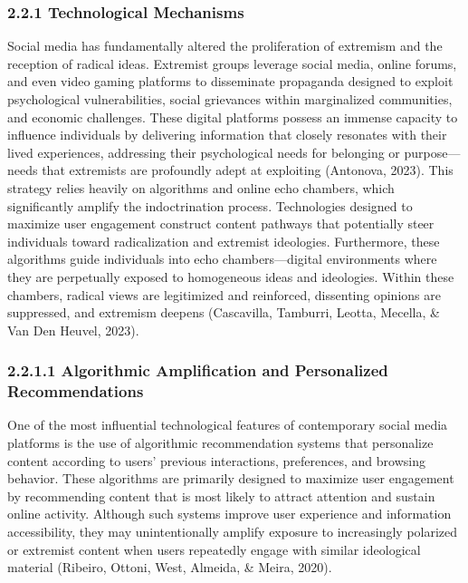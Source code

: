\documentclass[10pt]{NSP1}
\begin{document}
	\subsubsection*{2.2.1 Technological Mechanisms}
	
	Social media has fundamentally altered the proliferation of extremism and the reception of radical ideas. Extremist groups leverage social media, online forums, and even video gaming platforms to disseminate propaganda designed to exploit psychological vulnerabilities, social grievances within marginalized communities, and economic challenges. These digital platforms possess an immense capacity to influence individuals by delivering information that closely resonates with their lived experiences, addressing their psychological needs for belonging or purpose—needs that extremists are profoundly adept at exploiting (Antonova, 2023). This strategy relies heavily on algorithms and online echo chambers, which significantly amplify the indoctrination process. Technologies designed to maximize user engagement construct content pathways that potentially steer individuals toward radicalization and extremist ideologies. Furthermore, these algorithms guide individuals into echo chambers—digital environments where they are perpetually exposed to homogeneous ideas and ideologies. Within these chambers, radical views are legitimized and reinforced, dissenting opinions are suppressed, and extremism deepens (Cascavilla, Tamburri, Leotta, Mecella, \& Van Den Heuvel, 2023).
	
	\subsubsection*{2.2.1.1 Algorithmic Amplification and Personalized Recommendations}
	
	One of the most influential technological features of contemporary social media platforms is the use of algorithmic recommendation systems that personalize content according to users' previous interactions, preferences, and browsing behavior. These algorithms are primarily designed to maximize user engagement by recommending content that is most likely to attract attention and sustain online activity. Although such systems improve user experience and information accessibility, they may unintentionally amplify exposure to increasingly polarized or extremist content when users repeatedly engage with similar ideological material (Ribeiro, Ottoni, West, Almeida, \& Meira, 2020).
	
\end{document}
